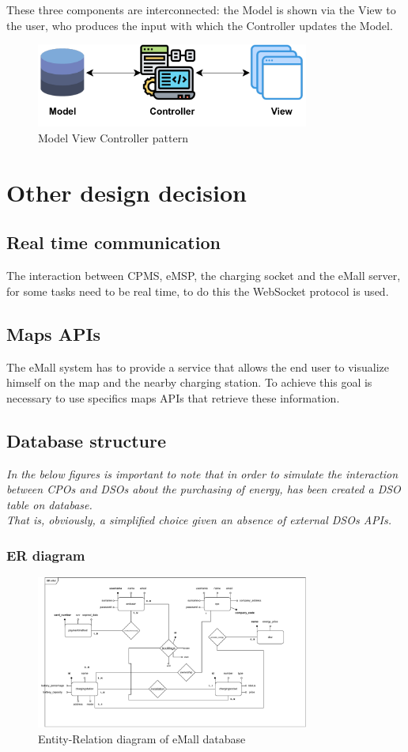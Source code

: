 \begin{itemize}
These three components are interconnected: the Model is shown via the View to the user, who produces the input with which the Controller updates the Model. 
\begin{figure}[H]
    \centering
    \includegraphics[width=0.8\textwidth]{images/restful_api.pdf}
    \caption{Model View Controller pattern}
    \label{fig:mvc}
\end{figure}
\end{itemize}
\section{Other design decision}
\subsection{Real time communication}
The interaction between CPMS, eMSP, the charging socket and the eMall server, for some tasks need to be real time, to do this the WebSocket protocol is used. 
\subsection{Maps APIs}
The eMall system has to provide a service that allows the end user to visualize himself on the map and the nearby charging station. To achieve this goal is necessary to use specifics maps APIs that retrieve these information.
\subsection{Database structure}
\textit{In the below figures is important to note that in order to simulate the interaction between CPOs and DSOs about the purchasing of energy, has been created a DSO table on database.\\
That is, obviously, a simplified choice given an absence of external DSOs APIs.}
\subsubsection{ER diagram}
\begin{figure}[H]
    \centering
    \includegraphics[width=0.8\textwidth]{images/er_db.pdf}
    \caption{Entity-Relation diagram of eMall database}
    \label{fig:er_diagram}
\end{figure}
